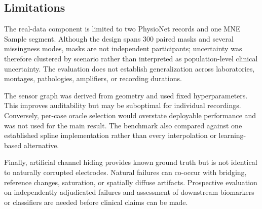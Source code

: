 \subsection{Limitations}
The real-data component is limited to two PhysioNet records and one MNE Sample segment. Although the design spans 300 paired masks and several missingness modes, masks are not independent participants; uncertainty was therefore clustered by scenario rather than interpreted as population-level clinical uncertainty. The evaluation does not establish generalization across laboratories, montages, pathologies, amplifiers, or recording durations.

The sensor graph was derived from geometry and used fixed hyperparameters. This improves auditability but may be suboptimal for individual recordings. Conversely, per-case oracle selection would overstate deployable performance and was not used for the main result. The benchmark also compared against one established spline implementation rather than every interpolation or learning-based alternative.

Finally, artificial channel hiding provides known ground truth but is not identical to naturally corrupted electrodes. Natural failures can co-occur with bridging, reference changes, saturation, or spatially diffuse artifacts. Prospective evaluation on independently adjudicated failures and assessment of downstream biomarkers or classifiers are needed before clinical claims can be made.